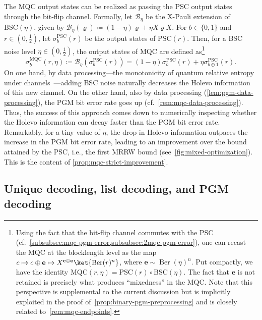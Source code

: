 \documentclass[11pt]{article}
\theoremstyle{remark}
\newcommand{\Ber}{\operatorname{Ber}}
\newcommand{\bits}{\{0,1\}}
\newcommand{\bc}{\mathbf{c}}
\newcommand{\be}{\mathbf{e}}
\newcommand{\BSC}{\mathrm{BSC}}
\newcommand{\PSC}{\mathrm{PSC}}
\newcommand{\MQC}{\mathrm{MQC}}
\begin{document}
The MQC output states can be realized as passing the PSC output states through the bit-flip channel. Formally, let $\mathcal{B}_\eta$ be the X-Pauli extension of $\BSC(\eta)$, given by 
$\mathcal{B}_\eta(\varrho) \coloneqq (1-\eta)\varrho + \eta X\varrho X$. For $b \in \bits$ and $r \in (0,\frac{1}{2})$, let $\sigma_b^{\PSC}(r)$ be the output states of $\PSC(r)$. Then, for a BSC noise level $\eta \in (0,\frac{1}{2})$, the output states of MQC are defined as\footnote{\label{fn:bsc-psc-composition} Using the fact that the bit-flip channel commutes with the PSC (cf.~\cref{subsubsec:mqc-pgm-error,subsubsec:2mqc-pgm-error}), one can recast the MQC at the blocklength level as the map $c \mapsto c \oplus \be \mapsto X^{\bc \oplus \be}\ket{\Ber(r)^n}$, where $\be \sim \Ber(\eta)^n$. Put compactly, we have the identity $\MQC(r,\eta) = \PSC(r) \circ \BSC(\eta)$. The fact that $\be$ is not retained is precisely what produces ``mixedness'' in the MQC. Note that this perspective is supplemental to the current discussion but is implicitly exploited in the proof of~\cref{prop:binary-pgm-preprocessing} and is closely related to~\cref{rem:mqc-endpoints}.}
\begin{equation*}
\sigma_b^{\MQC}(r,\eta) \coloneqq \mathcal{B}_\eta\left(\sigma_b^{\PSC}(r)\right) = (1-\eta)\sigma_b^{\PSC}(r)+\eta\sigma_{b \oplus 1}^{\PSC}(r).
\end{equation*}
On one hand, by data processing---the monotonicity of quantum relative entropy under channels~\cite{Lin75,Uhl77}---adding BSC noise naturally decreases the Holevo information of this new channel. On the other hand, also by data processing (\cref{lem:pgm-data-processing}), the PGM bit error rate goes up (cf.~\cref{rem:mqc-data-processing}). Thus, the success of this approach comes down to numerically inspecting whether the Holevo information can decay faster than the PGM bit error rate. Remarkably, for a tiny value of $\eta$, the drop in Holevo information outpaces the increase in the PGM bit error rate, leading to an improvement over the bound attained by the PSC, i.e., the first MRRW bound (see~\cref{fig:mixed-optimization}). This is the content of \cref{prop:mqc-strict-improvement}.

\subsection{Unique decoding, list decoding, and PGM decoding}
\label{subsec:unique-list-pgm}
\end{document}
